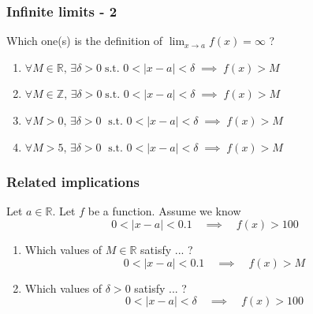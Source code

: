 \documentclass[14pt]{beamer}
\newcommand{\R}{\mathbb{R}}
\begin{document}
	\begin{frame}[t]
		\frametitle{Infinite limits - 2}

		Which one(s) is the definition of $\displaystyle \lim_{x \to a}f(x) = \infty$
		?
		\vfill
		\begin{enumerate}
			\item $\displaystyle \forall M \in \mathbb{R}, \, \exists \delta > 0 \; \text{
				s.t. }0 < |x-a|<\delta \; \implies \; f(x) > M$
				\vfill

			\item $\displaystyle \forall M \in \mathbb{Z}, \, \exists \delta > 0 \; \text{
				s.t. }0 < |x-a|<\delta \; \implies \; f(x) > M$
				\vfill

			\item $\displaystyle \forall M > 0, \, \exists \delta > 0 \; \text{ s.t. }0
				< |x-a|<\delta \; \implies \; f(x) > M$
				\vfill

			\item $\displaystyle \forall M > 5, \, \exists \delta > 0 \; \text{ s.t. }0
				< |x-a|<\delta \; \implies \; f(x) > M$
				\vfill

		\end{enumerate}
	\end{frame}

	\begin{frame}[t]
		\frametitle{Related implications}

		Let $a \in \mathbb{R}$. Let $f$ be a function. Assume we know
		\[
			0 < |x-a| < 0.1 \quad \implies \quad f(x) > 100
		\]
		\vspace{-.5cm}
		\begin{enumerate}
			\item Which values of $M \in \mathbb{R}$ satisfy ... ?
				\[
					0 < |x-a| < 0.1 \quad \implies \quad f(x) > M
				\]
				\vspace{-.5cm}

			\item Which values of $\delta>0$ satisfy ... ?
				\[
					0 < |x-a| < \delta \quad \implies \quad f(x) > 100
				\]
		\end{enumerate}
	\end{frame}
\end{document}
